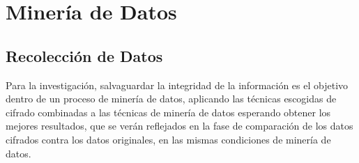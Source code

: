 \documentclass[a4paper,openright,12pt]{book}
\theoremstyle{definition}
\theoremstyle{remark}
\begin{document}
\section{Minería de Datos}

	\subsection{Recolección de Datos}
    Para la investigación, salvaguardar la integridad de la información es el objetivo dentro de un proceso de minería de datos, aplicando las técnicas escogidas de cifrado combinadas a las técnicas de minería de datos esperando obtener los mejores resultados, que se verán reflejados en la fase de comparación de los datos cifrados contra los datos originales, en las mismas condiciones de minería de datos.
    
\end{document}

